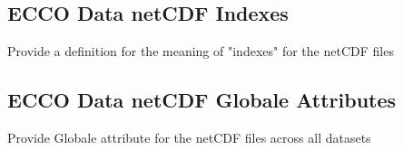 \subsection{ECCO Data netCDF Indexes}
\par Provide a definition for the meaning of "indexes" for the netCDF files
\subsection{ECCO Data netCDF Globale Attributes}

\par Provide Globale attribute for the netCDF files across all datasets










